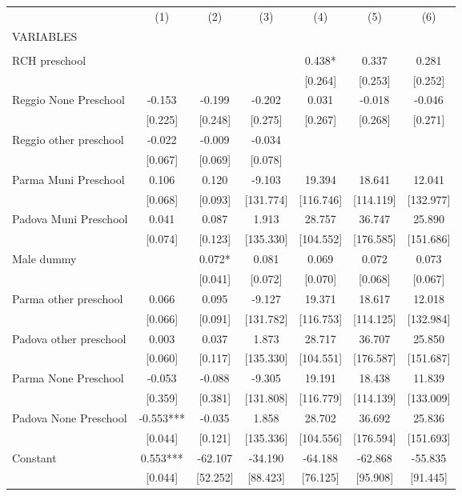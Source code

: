 \begin{tabular}{lcccccc} \hline
 & (1) & (2) & (3) & (4) & (5) & (6) \\
VARIABLES &  &  &  &  &  &  \\ \hline
 &  &  &  &  &  &  \\
RCH preschool &  &  &  & 0.438* & 0.337 & 0.281 \\
 &  &  &  & [0.264] & [0.253] & [0.252] \\
Reggio None Preschool & -0.153 & -0.199 & -0.202 & 0.031 & -0.018 & -0.046 \\
 & [0.225] & [0.248] & [0.275] & [0.267] & [0.268] & [0.271] \\
Reggio other preschool & -0.022 & -0.009 & -0.034 &  &  &  \\
 & [0.067] & [0.069] & [0.078] &  &  &  \\
Parma Muni Preschool & 0.106 & 0.120 & -9.103 & 19.394 & 18.641 & 12.041 \\
 & [0.068] & [0.093] & [131.774] & [116.746] & [114.119] & [132.977] \\
Padova Muni Preschool & 0.041 & 0.087 & 1.913 & 28.757 & 36.747 & 25.890 \\
 & [0.074] & [0.123] & [135.330] & [104.552] & [176.585] & [151.686] \\
Male dummy &  & 0.072* & 0.081 & 0.069 & 0.072 & 0.073 \\
 &  & [0.041] & [0.072] & [0.070] & [0.068] & [0.067] \\
Parma other preschool & 0.066 & 0.095 & -9.127 & 19.371 & 18.617 & 12.018 \\
 & [0.066] & [0.091] & [131.782] & [116.753] & [114.125] & [132.984] \\
Padova other preschool & 0.003 & 0.037 & 1.873 & 28.717 & 36.707 & 25.850 \\
 & [0.060] & [0.117] & [135.330] & [104.551] & [176.587] & [151.687] \\
Parma None Preschool & -0.053 & -0.088 & -9.305 & 19.191 & 18.438 & 11.839 \\
 & [0.359] & [0.381] & [131.808] & [116.779] & [114.139] & [133.009] \\
Padova None Preschool & -0.553*** & -0.035 & 1.858 & 28.702 & 36.692 & 25.836 \\
 & [0.044] & [0.121] & [135.336] & [104.556] & [176.594] & [151.693] \\
Constant & 0.553*** & -62.107 & -34.190 & -64.188 & -62.868 & -55.835 \\
 & [0.044] & [52.252] & [88.423] & [76.125] & [95.908] & [91.445] \\

\end{tabular}
